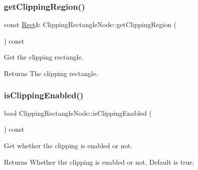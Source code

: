 \subsubsection{\texorpdfstring{get\+Clipping\+Region()}{getClippingRegion()}\hspace{0.1cm}{\footnotesize\ttfamily [2/2]}}
{\footnotesize\ttfamily const \hyperlink{classRect}{Rect}\& Clipping\+Rectangle\+Node\+::get\+Clipping\+Region (\begin{DoxyParamCaption}{ }\end{DoxyParamCaption}) const\hspace{0.3cm}{\ttfamily [inline]}}



Get the clipping rectangle. 

\begin{DoxyReturn}{Returns}
The clipping rectangle. 
\end{DoxyReturn}
\mbox{\label{classClippingRectangleNode_a8ebbf22123f002ba75266e25e050a031}} 
\subsubsection{\texorpdfstring{is\+Clipping\+Enabled()}{isClippingEnabled()}\hspace{0.1cm}{\footnotesize\ttfamily [1/2]}}
{\footnotesize\ttfamily bool Clipping\+Rectangle\+Node\+::is\+Clipping\+Enabled (\begin{DoxyParamCaption}{ }\end{DoxyParamCaption}) const\hspace{0.3cm}{\ttfamily [inline]}}



Get whether the clipping is enabled or not. 

\begin{DoxyReturn}{Returns}
Whether the clipping is enabled or not. Default is true. 
\end{DoxyReturn}
\mbox{\label{classClippingRectangleNode_a8ebbf22123f002ba75266e25e050a031}} 
